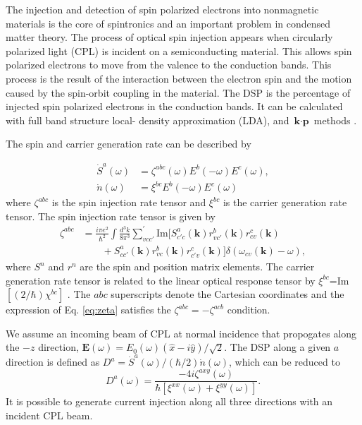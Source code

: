 \documentclass[pss]{wiley2sp} %
\begin{document}
The injection and detection of spin polarized electrons into nonmagnetic
materials is the core of spintronics \cite{vzuticRMP04,%
fertRMP08} and an important 
problem in condensed matter
theory. The process of optical spin injection appears when circularly
polarized light (CPL) \cite{dyakonovOO84} is incident on a
semiconducting material. This allows spin polarized electrons to move from the
valence to the conduction bands. This process is the result of the interaction
between the electron spin and the motion caused by the spin-orbit coupling in
the material. The DSP is the percentage of injected spin polarized electrons
in the conduction bands. It can be calculated with full band structure local-
density approximation (LDA), and $\textbf{k}\cdot\textbf{p}$ methods
\cite{nastosPRB07,cabellosPRB09}.

The spin and carrier generation rate can be described by 

\begin{align*}
\dot{S}^{a}(\omega) &= \zeta^{abc}(\omega)E^{b}(-\omega)E^{c}(\omega), \nonumber \\ 
\dot{n}(\omega)     &= \xi^{bc}E^{b}(-\omega)E^{c}(\omega)
\end{align*}
where $\zeta^{abc}$ is the spin injection rate tensor and $\xi^{bc}$ is the carrier generation rate tensor. The spin injection rate tensor is given by
\begin{align}\label{eq:zeta}
\zeta^{abc} &= \frac{i\pi e^{2}}{\hbar^{2}}\int\frac{d^{3}k}{8\pi^{3}}
\sum_{vcc'}^{\prime}\text{Im}\bigl[S^{a}_{c'c}(\textbf{k})
r^{b}_{vc'}(\textbf{k})r^{c}_{cv}(\textbf{k})\nonumber\\
&\qquad+S^{a}_{cc'}(\textbf{k})
r^{b}_{vc}(\textbf{k})r^{c}_{c'v}(\textbf{k})\bigr]
\delta(\omega_{cv}(\textbf{k})-\omega),
\end{align}
where $S^{n}$ and $r^{n}$ are the spin and position matrix elements. The carrier generation rate tensor is related to the linear optical response tensor by $\xi^{bc}$=Im$[(2/\hbar)\chi^{bc}]$ . The $abc$ superscripts denote the Cartesian coordinates and the expression of Eq. \eqref{eq:zeta} satisfies the $\zeta^{abc} = -\zeta^{acb}$ condition.

We assume an incoming beam of CPL at normal incidence that propogates along the $-z$ direction, $\mathbf{E}(\omega) = E_{0}(\omega)(\hat{x} - i\hat{y})/\sqrt{2}$. The DSP along a given $a$ direction is defined as $D^{a}=\dot{S}^{a}(\omega)/(\hbar/2)\dot{n}(\omega)$, which can be reduced to 
\begin{equation}\label{eq:D^i}
D^{a}(\omega) = 
\frac{-4i\zeta^{axy}(\omega)}
    {\hbar\left[\xi^{xx}(\omega) + \xi^{yy}(\omega)\right]}.
\end{equation}
It is possible to generate current injection along all three directions with
an incident CPL beam.
\end{document}
